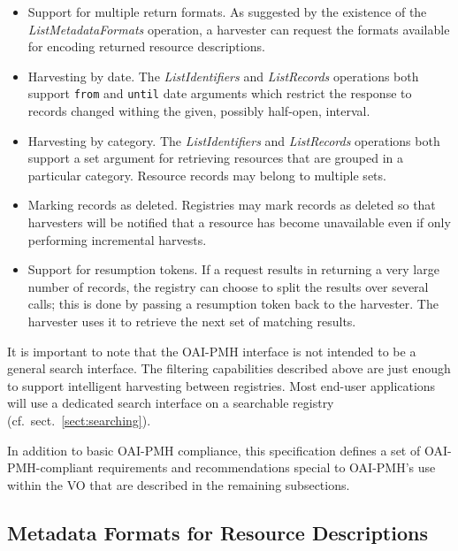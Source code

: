 \documentclass{ivoa}
\newcommand{\oaiop}[1]{\textit{#1}}
\begin{document}
\begin{itemize}

\item Support for multiple return formats. As suggested by the existence
of the
\oaiop{ListMetadataFormats}  operation, a harvester can request the
formats available for encoding returned resource descriptions.{}

\item Harvesting by date. The \oaiop{ListIdentifiers}  and
\oaiop{ListRecords}  operations both support \texttt{from}  and
\texttt{until}  date arguments which restrict the response to records
changed withing the given, possibly half-open, interval.{}

\item Harvesting by category. The \oaiop{ListIdentifiers}  and
\oaiop{ListRecords} operations both support a set argument for
retrieving resources that are grouped in a particular category. Resource
records may belong to multiple sets.{}

\item Marking records as deleted. Registries may mark records as deleted
so that harvesters will be notified that a resource has become
unavailable even if only performing incremental harvests.

\item Support for resumption tokens. If a request results in returning a
very large number of records, the registry can choose to split the
results over several calls; this is done by passing a resumption token
back to the harvester. The harvester uses it to retrieve the next set of
matching results.{}

\end{itemize}
It is important to note that the OAI-PMH interface is not intended
to be a general search interface. The filtering capabilities described
above are just enough to support intelligent harvesting between
registries. Most end-user applications will use a dedicated search
interface on a searchable registry (cf.~sect.~\ref{sect:searching}).

In addition to basic OAI-PMH compliance, this specification defines
a set of OAI-PMH-compliant requirements and recommendations
special to OAI-PMH's use within the VO that are described in the
remaining subsections.


\subsection{Metadata Formats for Resource Descriptions}
\end{document}
